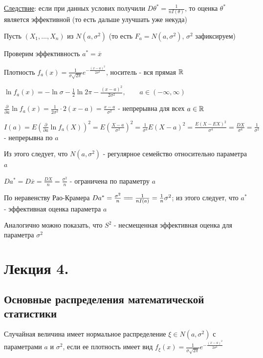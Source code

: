 \documentclass[12pt]{article}
\begin{document}
\underline{Следствие}: если при данных услових получили $D\theta^* = \frac{1}{n I(\theta)}$, то оценка $\theta^*$ является эффективной 
(то есть дальше улучшать уже некуда)

\Ex Пусть $(X_1, \dots, X_n)$ из $N(a, \sigma^2)$ (то есть $F_a = N(a, \sigma^2)$, $\sigma^2$ зафиксируем)

Проверим эффективность $a^* = \overline{x}$

Плотность $f_a(x) = \frac{1}{\sigma \sqrt{2\pi}} e^{-\frac{(x - a)^2}{2\sigma^2}}$, носитель - вся прямая $\mathbb{R}$

$\ln f_a(x) = -\ln \sigma - \frac{1}{2} \ln 2\pi - \frac{(x - a)^2}{2\sigma^2}, \quad\quad a \in (-\infty, \infty)$

$\frac{\partial}{\partial a} \ln f_a(x) = \frac{1}{2\sigma^2} \cdot 2(x - a) = \frac{x - a}{\sigma^2}$ - непрерывна для всех $a \in \mathbb{R}$

$I(a) = E\left(\frac{\partial}{\partial a} \ln f_a(X)\right)^2 = E\left(\frac{X - a}{\sigma^2}\right)^2 = \frac{1}{\sigma^4} E(X - a)^2 = \frac{E(X - EX)^2}{\sigma^4} = 
\frac{DX}{\sigma^4} = \frac{1}{\sigma^2}$ - непрерывна по $a$

Из этого следует, что $N(a, \sigma^2)$ - регулярное семейство относительно параметра $a$

$Da^* = D\overline{x} = \frac{DX}{n} = \frac{\sigma^2}{n}$ - ограничена по параметру $a$

По неравенству Рао-Крамера $Da^* = \frac{\sigma^2}{n} =\joinrel= \frac{1}{nI(a)} = \frac{1}{n} \sigma^2$; из 
этого следует, что $a^*$ - эффективная оценка параметра $a$

\Nota Аналогично можно показать, что $S^2$ - несмещенная эффективная оценка для параметра $\sigma^2$






\section{Лекция 4.}

\subsection{Основные распределения математической статистики}

\Def Случайная величина имеет нормальное распределение $\xi \in N(a, \sigma^2)$ с параметрами $a$ и $\sigma^2$, если
ее плотность имеет вид $f_\xi(x) = \frac{1}{\sigma\sqrt{2\pi}} e^{-\frac{(x - a)^2}{2\sigma^2}}$
\end{document}
